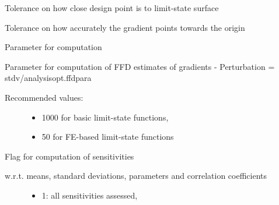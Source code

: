 \documentclass[letterpaper,10pt,english]{sphinxmanual}
\begin{document}
\begin{fulllineitems}

\begin{fulllineitems}
\label{model:pyre.model.AnalysisOptions.e1}
Tolerance on how close design point is to limit-state surface

\end{fulllineitems}


\begin{fulllineitems}
\label{model:pyre.model.AnalysisOptions.e2}
Tolerance on how accurately the gradient points towards the origin

\end{fulllineitems}


\begin{fulllineitems}
\label{model:pyre.model.AnalysisOptions.ffdpara}
Parameter for computation

Parameter for computation of FFD estimates of gradients - Perturbation =
stdv/analysisopt.ffdpara
\begin{description}
\item[{Recommended values:}] \leavevmode\begin{itemize}
\item {} 
1000 for basic limit-state functions,

\item {} 
50 for FE-based limit-state functions

\end{itemize}

\end{description}

\end{fulllineitems}


\begin{fulllineitems}
\label{model:pyre.model.AnalysisOptions.flag_sens}
Flag for computation of sensitivities
\begin{description}
\item[{w.r.t. means, standard deviations, parameters and correlation coefficients}] \leavevmode\begin{itemize}
\item {} 
1: all sensitivities assessed,


\end{itemize}
\end{description}
\end{fulllineitems}
\end{fulllineitems}
\end{document}

